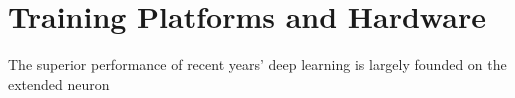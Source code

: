 \section{Training Platforms and Hardware}
The superior performance of recent years' deep learning is largely founded on the extended neuron 